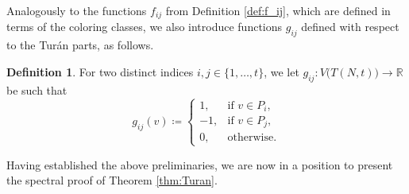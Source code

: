 \documentclass{article}
\newcommand{\R}{\mathbb{R}}
\theoremstyle{plain}
\theoremstyle{definition}
\newtheorem{definition}[theorem]{Definition}
\theoremstyle{remark}
\begin{document}
Analogously to the functions $f_{ij}$ from Definition \ref{def:f_ij}, which are defined in terms of the coloring classes, we also introduce  functions $g_{ij}$ defined with respect to the Turán parts, as follows.


\begin{definition}\label{def:g_ij}
    For two distinct indices $i,j\in\{1,\ldots,t\}$, we let $g_{ij}\colon V\bigl(T(N,t)\bigr)\to\R$ be such that
    \[
    g_{ij}(v) \coloneqq \begin{cases}
        1, &\text{if } v\in P_i,\\
        -1, &\text{if } v\in P_j,\\
        0, &\text{otherwise.}
    \end{cases}
    \]
\end{definition}

Having established the above preliminaries, we are now in a position to present the spectral proof of Theorem \ref{thm:Turan}.
\end{document}
